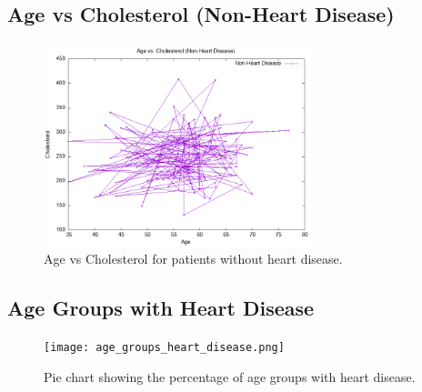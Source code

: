 \documentclass{article}
\begin{document}
\subsection{Age vs Cholesterol (Non-Heart Disease)}
\begin{figure}[h!]
    \centering
    \includegraphics[width=0.7\textwidth]{age_vs_cholesterol_non_heart_disease.png}
    \caption{Age vs Cholesterol for patients without heart disease.}
    \label{fig:age_cholesterol_non_heart_disease}
\end{figure}

\subsection{Age Groups with Heart Disease}
\begin{figure}[h!]
    \centering
    \texttt{[image: age\_groups\_heart\_disease.png]}
    \caption{Pie chart showing the percentage of age groups with heart disease.}
    \label{fig:age_groups_heart_disease}
\end{figure}
\end{document}
